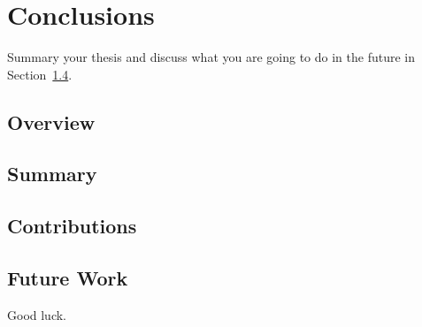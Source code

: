 \chapter{Conclusions}
\label{cha:conc}
Summary your thesis and discuss what you are going to do in the future in Section~\ref{sec:future}.

\section{Overview}
\label{sec:overview}

\section{Summary}
\label{sec:summary}

\section{Contributions}
\label{sec:contributions}

\section{Future Work}
\label{sec:future}
Good luck.




